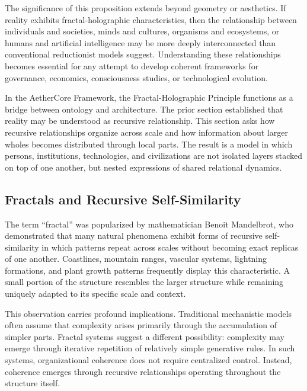 \documentclass[12pt]{article}
\begin{document}
The significance of this proposition extends beyond geometry or aesthetics. If reality exhibits fractal-holographic characteristics, then the relationship between individuals and societies, minds and cultures, organisms and ecosystems, or humans and artificial intelligence may be more deeply interconnected than conventional reductionist models suggest. Understanding these relationships becomes essential for any attempt to develop coherent frameworks for governance, economics, consciousness studies, or technological evolution.

In the AetherCore Framework, the Fractal-Holographic Principle functions as a bridge between ontology and architecture. The prior section established that reality may be understood as recursive relationship. This section asks how recursive relationships organize across scale and how information about larger wholes becomes distributed through local parts. The result is a model in which persons, institutions, technologies, and civilizations are not isolated layers stacked on top of one another, but nested expressions of shared relational dynamics.


\subsection{Fractals and Recursive Self-Similarity}

The term ``fractal'' was popularized by mathematician Benoit Mandelbrot, who demonstrated that many natural phenomena exhibit forms of recursive self-similarity in which patterns repeat across scales without becoming exact replicas of one another. Coastlines, mountain ranges, vascular systems, lightning formations, and plant growth patterns frequently display this characteristic. A small portion of the structure resembles the larger structure while remaining uniquely adapted to its specific scale and context.

This observation carries profound implications. Traditional mechanistic models often assume that complexity arises primarily through the accumulation of simpler parts. Fractal systems suggest a different possibility: complexity may emerge through iterative repetition of relatively simple generative rules. In such systems, organizational coherence does not require centralized control. Instead, coherence emerges through recursive relationships operating throughout the structure itself.
\end{document}
